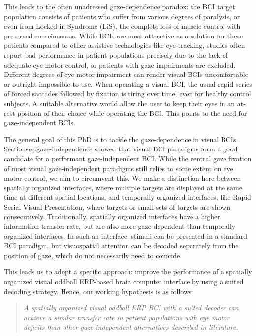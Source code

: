 This leads to the often unadressed gaze-dependence paradox: the BCI target
population consists of patients who suffer from various degrees
of paralysis, or even from Locked-in Syndrome (LiS), the complete loss of muscle
control with preserved consciousness.
While BCIs are most attractive as a solution for these patients
compared to other assistive technologies like eye-tracking, studies often
report bad performance in patient populations precisely due to the lack of adequate eye motor
control, or patients with gaze impairments are excluded.
Different degrees of eye motor impairment can render visual BCIs
uncomfortable or outright impossible to use.
When operating a visual BCI, the usual rapid series of forced saccades followed
by fixation is tiring over time, even for healthy control subjects.
A suitable alternative would allow the user to keep their eyes in an at-rest
position of their choice while operating the BCI.
This points to the need for gaze-independent BCIs.

The general goal of this PhD is to tackle the gaze-dependence in visual BCIs.
Section{sec:gaze-independence} showed that visual BCI paradigms form
a good candidate for a performant gaze-independent BCI.
While the central gaze fixation of most visual gaze-independent paradigms still
relies to some extent on eye motor control, we aim to circumvent this.
We make a distinction here between spatially organized interfaces, where
multiple targets are displayed at the same time at different spatial locations,
and temporally organized interfaces, like Rapid Serial Visual
Presentation,
where targets or small sets of targets are shown consecutively.
Traditionally, spatially organized interfaces have a higher information transfer
rate, but are also more gaze-dependent than temporally organized interfaces.
In such an interface, stimuli can be presented in a standard BCI paradigm, but
visuospatial attention can be decoded separately from the position of gaze,
which do not necessarily need to coincide.

This leads us to adopt a specific approach: improve the performance of a
spatially organized visual oddball ERP-based brain
computer interface by using a suited decoding strategy.
Hence, our working hypothesis is as follows:
\begin{quote}
	\textit{A spatially organized visual oddball ERP BCI with a suited decoder
		can achieve a similar transfer rate in patient
		populations with eye motor deficits than other gaze-independent alternatives
    described in literature.}
\end{quote}

